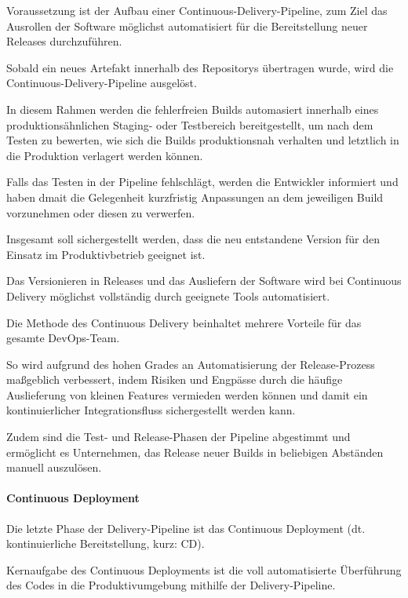 Voraussetzung ist der Aufbau einer Continuous-Delivery-Pipeline, zum Ziel das Ausrollen der Software möglichst automatisiert für die Bereitstellung neuer Releases durchzuführen. \cite[S. 10]{wolff_continuous_2016}

Sobald ein neues Artefakt innerhalb des Repositorys übertragen wurde, wird die Continuous-Delivery-Pipeline ausgelöst. \cite[S. 14]{verona_practical_2016} 

In diesem Rahmen werden die fehlerfreien Builds automasiert innerhalb eines produktionsähnlichen Staging- oder Testbereich bereitgestellt, um nach dem Testen zu bewerten, wie sich die Builds produktionsnah verhalten und letztlich in die Produktion verlagert werden können. \cite[S. 16]{sharma_devops_2017}

Falls das Testen in der Pipeline fehlschlägt, werden die Entwickler informiert und haben dmait die Gelegenheit kurzfristig Anpassungen an dem jeweiligen Build vorzunehmen oder diesen zu verwerfen. 

Insgesamt soll sichergestellt werden, dass die neu entstandene Version für den Einsatz im Produktivbetrieb geeignet ist. \cite{thedev_eight_2019}

Das Versionieren in Releases und das Ausliefern der Software wird bei Continuous Delivery möglichst vollständig durch geeignete Tools automatisiert. 

Die Methode des Continuous Delivery beinhaltet mehrere Vorteile für das gesamte DevOps-Team. 

So wird aufgrund des hohen Grades an Automatisierung der Release-Prozess maßgeblich verbessert, indem Risiken und Engpässe durch die häufige Auslieferung von kleinen Features vermieden werden können und damit ein kontinuierlicher Integrationsfluss sichergestellt werden kann. \cite[S. 18]{wolff_continuous_2016}

Zudem sind die Test- und Release-Phasen der Pipeline abgestimmt und ermöglicht es Unternehmen, das Release neuer Builds in beliebigen Abständen manuell auszulösen. \cite{thedev_eight_2019}

\paragraph{Continuous Deployment}

Die letzte Phase der Delivery-Pipeline ist das Continuous Deployment (dt. kontinuierliche Bereitstellung, kurz: CD).

Kernaufgabe des Continuous Deployments ist die voll automatisierte Überführung des Codes in die Produktivumgebung mithilfe der Delivery-Pipeline. \cite[S. 29]{alt_innovationsorientiertes_2017} 

